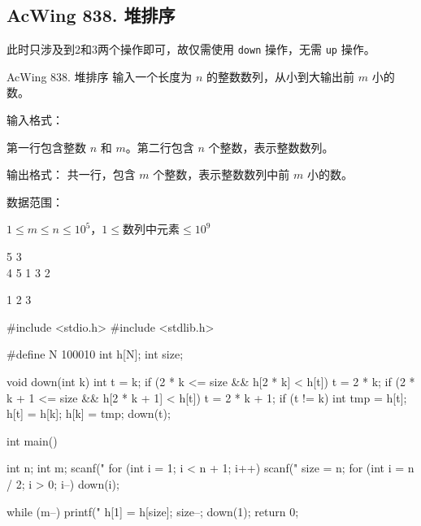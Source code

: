 \subsection{AcWing 838. 堆排序}
此时只涉及到2和3两个操作即可，故仅需使用 \lstinline{down} 操作，无需 \lstinline{up} 操作。

\begin{titledbox}{AcWing 838. 堆排序}
    输入一个长度为 $n$ 的整数数列，从小到大输出前 $m$ 小的数。

    输入格式：

    第一行包含整数 $n$ 和 $m$。第二行包含 $n$ 个整数，表示整数数列。

    输出格式：
    共一行，包含 $m$ 个整数，表示整数数列中前 $m$ 小的数。

    数据范围：

    $1 \le m \le n \le 10^5$，$1 \le 数列中元素 \le 10^9$

    \begin{inputblock}
        5 3 \\
        4 5 1 3 2
    \end{inputblock}
    \begin{outputblock}
        1 2 3
    \end{outputblock}

\end{titledbox}

\begin{mycpptwocol}[堆排序]
    #include <stdio.h>
    #include <stdlib.h>

    #define N 100010
    int h[N];
    int size;

    void down(int k) {
        int t = k;
        if (2 * k <= size && h[2 * k] < h[t]) {
            t = 2 * k;
        }
        if (2 * k + 1 <= size && h[2 * k + 1] < h[t]) {
            t = 2 * k + 1;
        }
        if (t != k) {
            int tmp = h[t];
            h[t] = h[k];
            h[k] = tmp;
            down(t);
        }
    }

    int main() {
        int n;
        int m;
        scanf("%
        for (int i = 1; i < n + 1; i++) {
            scanf("%
        }
        size = n;
        for (int i = n / 2; i > 0; i--) {
            down(i);
        }

        while (m--) {
            printf("%
            h[1] = h[size];
            size--;
            down(1);
        }
        return 0;
    }
\end{mycpptwocol}

